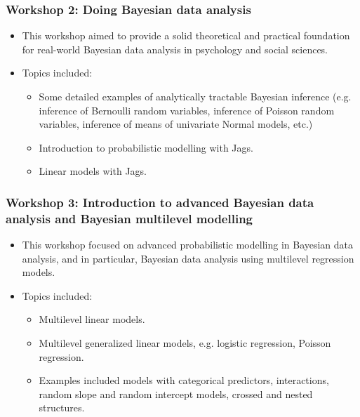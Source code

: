 \begin{frame}
	\frametitle{Workshop 2: Doing Bayesian data analysis}

	\begin{itemize}
		\item This workshop aimed to provide a solid theoretical and practical foundation for real-world Bayesian data analysis in psychology and social sciences.
		\item Topics included:
			\begin{itemize}
				\item Some detailed examples of analytically tractable Bayesian inference (e.g. inference of Bernoulli random variables, inference of Poisson random variables, inference of means of univariate Normal models, etc.)
				\item Introduction to probabilistic modelling with Jags.
				\item Linear models with Jags.
			\end{itemize}

	\end{itemize}

\end{frame}

\begin{frame}
	\frametitle{Workshop 3: Introduction to advanced Bayesian data analysis and Bayesian multilevel modelling}

	\begin{itemize}
		\item This workshop focused on advanced probabilistic modelling
			in Bayesian data analysis, and in particular, Bayesian
			data analysis using multilevel regression models.
		\item Topics included:
			\begin{itemize}
				\item Multilevel linear models.
				\item Multilevel generalized linear models, e.g. logistic regression, Poisson regression.
				\item Examples included models with categorical predictors, interactions, random slope and random intercept models, crossed and nested structures.
			\end{itemize}
	\end{itemize}

\end{frame}

